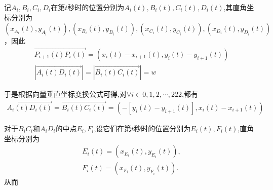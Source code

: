 \documentclass[../main.tex]{subfiles}
\begin{document}
 
  \par 记$A_i,B_i,C_i,D_i$在第$t$秒时的位置分别为$A_i(t),B_i(t),C_i(t),D_i(t)$,其直角坐标分别为$(x_{A_i}(t),y_{A_i}(t)),(x_{B_i}(t),y_{B_i}(t)),(x_{C_i}(t),y_{C_i}(t)),(x_{D_i}(t),y_{D_i}(t))$，因此
  \begin{gather}
  \overrightarrow{P_{i+1}\left( t \right) P_i\left( t \right) }=\left( x_i\left( t \right) -x_{i+1}\left( t \right) ,y_i\left( t \right) -y_{i+1}\left( t \right) \right) \label{problem-2.1}
 \\
 \left| \overrightarrow{A_i\left( t \right) D_i\left( t \right) } \right|=\left| \overrightarrow{B_i\left( t \right) C_i\left( t \right) } \right|=w\label{problem-2.3}
 \end{gather}
 \par 于是根据向量垂直坐标变换公式可得,对$\forall i\in {0,1,2,\cdots,222}$,都有
 \begin{gather}
 \overrightarrow{A_i\left( t \right) D_i\left( t \right) }=\overrightarrow{B_i\left( t \right) C_i\left( t \right) }=\left( -\left[ y_i\left( t \right) -y_{i+1}\left( t \right) \right] ,x_i\left( t \right) -x_{i+1}\left( t \right) \right) \label{problem-2.2}
 \end{gather}
  \par 对于$B_iC_i$和$A_iD_i$的中点$E_i,F_i$,设它们在第$t$秒时的位置分别为$E_i(t),F_i(t)$,直角坐标分别为
  \begin{align}
     E_i(t)=(x_{E_i}(t),y_{E_i}(t)),\label{1.........20}
     \\
     F_i(t)=(x_{F_i}(t),y_{F_i}(t)).\label{1.........21}
     \end{align}
     从而
\end{document}
